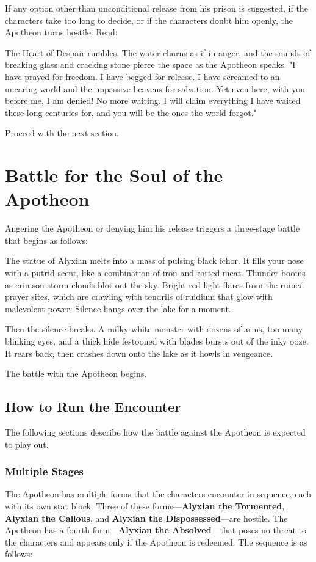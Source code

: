 \documentclass[10pt,a4paper,twoside,bg=print,twocolumn,openany,nodeprecatedcode]{dndbook}
\begin{document}
If any option other than unconditional release from his prison is suggested, if the characters take too long to decide, or if the characters doubt him openly, the Apotheon turns hostile. Read:

\begin{DndReadAloud}{}
The Heart of Despair rumbles. The water churns as if in anger, and the sounds of breaking glass and cracking stone pierce the space as the Apotheon speaks. "I have prayed for freedom. I have begged for release. I have screamed to an uncaring world and the impassive heavens for salvation. Yet even here, with you before me, I am denied! No more waiting. I will claim everything I have waited these long centuries for, and you will be the ones the world forgot."

\end{DndReadAloud}

Proceed with the next section.

\section{Battle for the Soul of the Apotheon}
Angering the Apotheon or denying him his release triggers a three-stage battle that begins as follows:

\begin{DndReadAloud}{}
The statue of Alyxian melts into a mass of pulsing black ichor. It fills your nose with a putrid scent, like a combination of iron and rotted meat. Thunder booms as crimson storm clouds blot out the sky. Bright red light flares from the ruined prayer sites, which are crawling with tendrils of ruidium that glow with malevolent power. Silence hangs over the lake for a moment.

Then the silence breaks. A milky-white monster with dozens of arms, too many blinking eyes, and a thick hide festooned with blades bursts out of the inky ooze. It rears back, then crashes down onto the lake as it howls in vengeance.

\end{DndReadAloud}

The battle with the Apotheon begins.

\subsection{How to Run the Encounter}
The following sections describe how the battle against the Apotheon is expected to play out.

\subsubsection{Multiple Stages}
The Apotheon has multiple forms that the characters encounter in sequence, each with its own stat block. Three of these forms—\textbf{Alyxian the Tormented}, \textbf{Alyxian the Callous}, and \textbf{Alyxian the Dispossessed}—are hostile. The Apotheon has a fourth form—\textbf{Alyxian the Absolved}—that poses no threat to the characters and appears only if the Apotheon is redeemed. The sequence is as follows:
\end{document}
